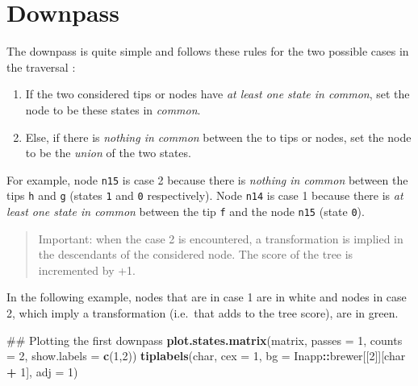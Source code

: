 \documentclass[]{book}
\newenvironment{Shaded}{\begin{snugshade}}{\end{snugshade}}
\newcommand{\KeywordTok}[1]{\textcolor[rgb]{0.13,0.29,0.53}{\textbf{#1}}}
\newcommand{\DataTypeTok}[1]{\textcolor[rgb]{0.13,0.29,0.53}{#1}}
\newcommand{\DecValTok}[1]{\textcolor[rgb]{0.00,0.00,0.81}{#1}}
\newcommand{\StringTok}[1]{\textcolor[rgb]{0.31,0.60,0.02}{#1}}
\newcommand{\OperatorTok}[1]{\textcolor[rgb]{0.81,0.36,0.00}{\textbf{#1}}}
\newcommand{\NormalTok}[1]{#1}
\providecommand{\tightlist}{%
  \setlength{\itemsep}{0pt}\setlength{\parskip}{0pt}}
\theoremstyle{definition}
\theoremstyle{definition}
\theoremstyle{definition}
\theoremstyle{remark}
\begin{document}
\section{Downpass}\label{downpass}

The downpass is quite simple and follows these rules for the two
possible cases in the traversal \citep{Fitch1971}:

\begin{enumerate}
\def\labelenumi{\arabic{enumi}.}
\tightlist
\item
  If the two considered tips or nodes have \emph{at least one state in
  common}, set the node to be these states in \emph{common}.
\item
  Else, if there is \emph{nothing in common} between the to tips or
  nodes, set the node to be the \emph{union} of the two states.
\end{enumerate}

For example, node \texttt{n15} is case 2 because there is \emph{nothing
in common} between the tips \texttt{h} and \texttt{g} (states \texttt{1}
and \texttt{0} respectively). Node \texttt{n14} is case 1 because there
is \emph{at least one state in common} between the tip \texttt{f} and
the node \texttt{n15} (state \texttt{0}).

\begin{quote}
Important: when the case 2 is encountered, a transformation is implied
in the descendants of the considered node. The score of the tree is
incremented by +1.
\end{quote}

In the following example, nodes that are in case 1 are in white and
nodes in case 2, which imply a transformation (i.e.~that adds to the
tree score), are in green.

\begin{Shaded}
\begin{Highlighting}[]
\NormalTok{## Plotting the first downpass}
\KeywordTok{plot.states.matrix}\NormalTok{(matrix, }\DataTypeTok{passes =} \DecValTok{1}\NormalTok{, }\DataTypeTok{counts =} \DecValTok{2}\NormalTok{, }\DataTypeTok{show.labels =} \KeywordTok{c}\NormalTok{(}\DecValTok{1}\NormalTok{,}\DecValTok{2}\NormalTok{))}
\KeywordTok{tiplabels}\NormalTok{(char, }\DataTypeTok{cex =} \DecValTok{1}\NormalTok{, }\DataTypeTok{bg =}\NormalTok{ Inapp}\OperatorTok{::}\NormalTok{brewer[[}\DecValTok{2}\NormalTok{]][char }\OperatorTok{+}\StringTok{ }\DecValTok{1}\NormalTok{], }\DataTypeTok{adj =} \DecValTok{1}\NormalTok{)}
\end{Highlighting}
\end{Shaded}
\end{document}
